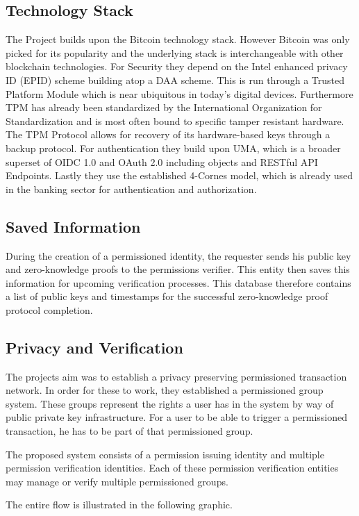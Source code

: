 \subsection{Technology Stack}
The Project builds upon the Bitcoin technology stack. However Bitcoin was only picked for its popularity and the underlying stack is interchangeable with other blockchain technologies. For Security they depend on the Intel enhanced privacy ID (EPID) scheme building atop a DAA scheme. This is run through a Trusted Platform Module which is near ubiquitous in today's digital devices. Furthermore TPM has already been standardized by the International Organization for Standardization and is most often bound to specific tamper resistant hardware. The TPM Protocol allows for recovery of its hardware-based keys through a backup protocol.
For authentication they build upon UMA, which is a broader superset of OIDC 1.0 and OAuth 2.0 including objects and RESTful API Endpoints.
Lastly they use the established 4-Cornes model, which is already used in the banking sector for authentication and authorization.

\subsection{Saved Information}
During the creation of a permissioned identity, the requester sends his public key and zero-knowledge proofs to the permissions verifier. This entity then saves this information for upcoming verification processes. This database therefore contains a list of public keys and timestamps for the successful zero-knowledge proof protocol completion.

\subsection{Privacy and Verification}
The projects aim was to establish a privacy preserving permissioned transaction network. In order for these to work, they established a permissioned group system. These groups represent the rights a user has in the system by way of public private key infrastructure. For a user to be able to trigger a permissioned transaction, he has to be part of that permissioned group.

The proposed system consists of a permission issuing identity and multiple permission verification identities. Each of these permission verification entities may manage or verify multiple permissioned groups.

The entire flow is illustrated in the following graphic.

